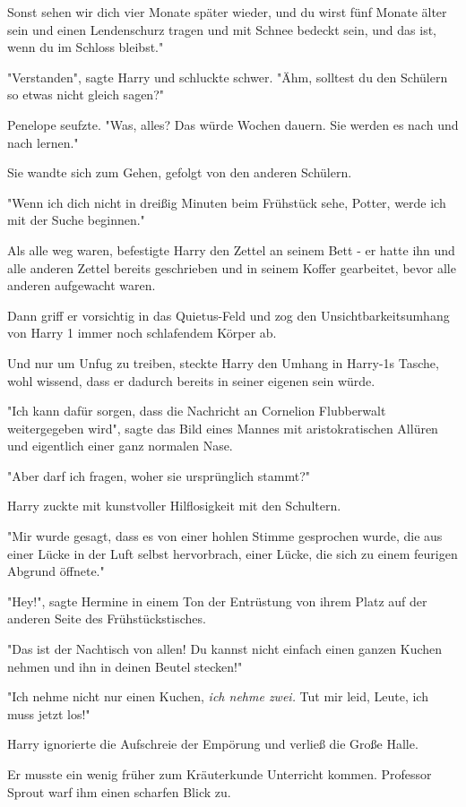 {Sonst sehen wir dich vier Monate später wieder, und du wirst fünf Monate älter sein und einen Lendenschurz tragen und mit Schnee bedeckt sein, und das ist, wenn du im Schloss bleibst."

"Verstanden", sagte Harry und schluckte schwer. "Ähm, solltest du den Schülern so etwas nicht gleich sagen?"

Penelope seufzte. "Was, alles? Das würde Wochen dauern. Sie werden es nach und nach lernen."

Sie wandte sich zum Gehen, gefolgt von den anderen Schülern.

"Wenn ich dich nicht in dreißig Minuten beim Frühstück sehe, Potter, werde ich mit der Suche beginnen."

Als alle weg waren, befestigte Harry den Zettel an seinem Bett - er hatte ihn und alle anderen Zettel bereits geschrieben und in seinem Koffer gearbeitet, bevor alle anderen aufgewacht waren.

Dann griff er vorsichtig in das Quietus-Feld und zog den Unsichtbarkeitsumhang von Harry 1 immer noch schlafendem Körper ab.

Und nur um Unfug zu treiben, steckte Harry den Umhang in Harry-1s Tasche, wohl wissend, dass er dadurch bereits in seiner eigenen sein würde.

"Ich kann dafür sorgen, dass die Nachricht an Cornelion Flubberwalt weitergegeben wird", sagte das Bild eines Mannes mit aristokratischen Allüren und eigentlich einer ganz normalen Nase.

"Aber darf ich fragen, woher sie ursprünglich stammt?"

Harry zuckte mit kunstvoller Hilflosigkeit mit den Schultern.

"Mir wurde gesagt, dass es von einer hohlen Stimme gesprochen wurde, die aus einer Lücke in der Luft selbst hervorbrach, einer Lücke, die sich zu einem feurigen Abgrund öffnete."

"Hey!", sagte Hermine in einem Ton der Entrüstung von ihrem Platz auf der anderen Seite des Frühstückstisches.

"Das ist der Nachtisch von allen! Du kannst nicht einfach einen ganzen Kuchen nehmen und ihn in deinen Beutel stecken!"

"Ich nehme nicht nur einen Kuchen, \emph{ich nehme zwei.} Tut mir leid, Leute, ich muss jetzt los!"

Harry ignorierte die Aufschreie der Empörung und verließ die Große Halle.

Er musste ein wenig früher zum Kräuterkunde Unterricht kommen. Professor Sprout warf ihm einen scharfen Blick zu.

}
